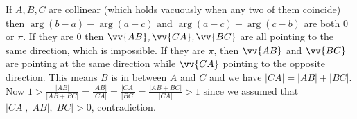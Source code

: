 \documentclass[11pt]{article}
\begin{document}
\begin{enumerate}
If $A,B,C$ are collinear (which holds vacuously when any two of them coincide) then $\arg (b-a)-\arg (a-c)$ and $\arg (a-c)-\arg (c-b)$ are both 0 or $\pi$. If they are 0 then $\vv{AB}, \vv{CA}, \vv{BC}$ are all pointing to the same direction, which is impossible. If they are $\pi$, then $\vv{AB}$ and $\vv{BC}$ are pointing at the same direction while $\vv{CA}$ pointing to the opposite direction. This means $B$ is in between $A$ and $C$ and we have $|CA|=|AB|+|BC|$. Now $1>\frac{|AB|}{|AB+BC|}=\frac{|AB|}{|CA|}=\frac{|CA|}{|BC|}=\frac{|AB+BC|}{|CA|}>1$ since we assumed that $|CA|, |AB|, |BC|>0$, contradiction.

\end{enumerate}
\end{document}
